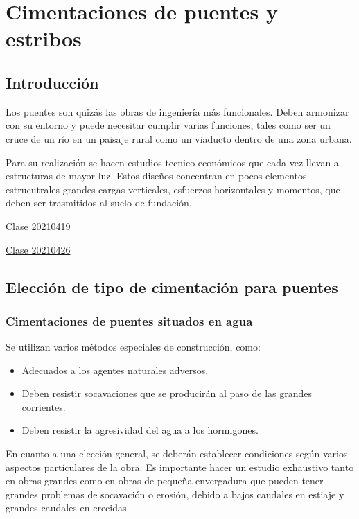 \documentclass[../main.tex]{subfiles}
\begin{document}
\section{Cimentaciones de puentes y estribos}
\subsection{Introducción}

Los puentes son quizás las obras de ingeniería más funcionales. Deben armonizar
con su entorno y puede necesitar cumplir varias funciones, tales como ser un 
cruce de un río en un paisaje rural como un viaducto dentro de una zona urbana.

Para su realización se hacen estudios tecnico económicos que cada vez llevan a 
estructuras de mayor luz. Estos diseños concentran en pocos elementos estrucutrales
grandes cargas verticales, esfuerzos horizontales y momentos, que deben ser 
trasmitidos al suelo de fundación.

\href{https://www.youtube.com/watch?v=LyQQdtYYsDg&list=PLoCwJEKoNRRSnxTfFvDsURfwHPFCMAOes&index=12}{Clase 20210419}


\href{https://youtu.be/qkJL8dide8k}{Clase 20210426}

\subsection{Elección de tipo de cimentación para puentes}


\subsubsection{Cimentaciones de puentes situados en agua}

Se utilizan varios métodos especiales de construcción, como:

\begin{itemize}
  \item Adecuados a los agentes naturales adversos.
  \item Deben resistir socavaciones que se producirán al paso de las grandes
    corrientes.
  \item Deben resistir la agresividad del agua a los hormigones.
\end{itemize}

En cuanto a una elección general, se deberán establecer condiciones según varios
aspectos partículares de la obra. Es importante hacer un estudio exhaustivo tanto
en obras grandes como en obras de pequeña envergadura que pueden tener grandes
problemas de socavación o erosión, debido a bajos caudales en estiaje y grandes
caudales en crecidas. 
\end{document}
